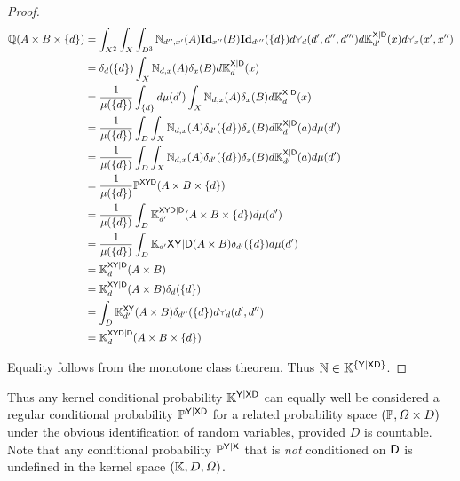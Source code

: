 \begin{proof}
\begin{align}
\prob{Q}(A\times B\times \{d\}) &= \int_{X^2} \int_X \int_{D^3} \kernel{N}_{d'',x'}(A) \textbf{Id}_{x''}(B) \textbf{Id}_{d'''} (\{d\}) d\splitter{0.1}_d(d',d'',d''') d\kernel{K}^{\RV{X}|\RV{D}}_{d'}(x)d\splitter{0.1}_x(x',x'')\\
							&= \delta_d(\{d\}) \int_X \kernel{N}_{d,x}(A) \delta_x(B) d\kernel{K}^{\RV{X}|\RV{D}}_d(x)\\
							&= \frac{1}{\mu(\{d\})} \int_{\{d\}} d\mu(d') \int_X \kernel{N}_{d,x}(A) \delta_x(B) d\kernel{K}^{\RV{X}|\RV{D}}_d(x)\\
							&= \frac{1}{\mu(\{d\})} \int_D\int_X \kernel{N}_{d,x}(A) \delta_{d'}(\{d\}) \delta_x(B) d\kernel{K}^{\RV{X}|\RV{D}}_d(a) d\mu(d')\\
							&= \frac{1}{\mu(\{d\})} \int_D\int_X \kernel{N}_{d,x}(A) \delta_{d'}(\{d\}) \delta_x(B) d\kernel{K}^{\RV{X}|\RV{D}}_{d'}(a) d\mu(d')\\
							&= \frac{1}{\mu(\{d\})} \prob{P}^{\RV{X}\RV{Y}\RV{D}}(A\times B\times \{d\})\\
							&= \frac{1}{\mu(\{d\})} \int_D \kernel{K}_{d'}^{\RV{X}\RV{Y}\RV{D}|\RV{D}}(A\times B\times \{d\})d\mu(d')\\
							&= \frac{1}{\mu(\{d\})} \int_D \kernel{K}_{d'}{\RV{X}\RV{Y}|\RV{D}}(A\times B) \delta_{d'}(\{d\})d\mu(d')\\
							&= \kernel{K}_{d}^{\RV{X}\RV{Y}|\RV{D}}(A\times B)\\
							&= \kernel{K}_d^{\RV{X}\RV{Y}|\RV{D}}(A\times B) \delta_d(\{d\})\\
							&= \int_D \kernel{K}_{d'}^{\RV{X}\RV{Y}} (A\times B) \delta_{d''}(\{d\}) d\splitter{0.1}_d(d',d'')\\
							&= \kernel{K}_d^{\RV{X}\RV{Y}\RV{D}|\RV{D}}(A\times B\times \{d\})
\end{align}


Equality follows from the monotone class theorem. Thus $\mathbb{N}\in \mathbb{K}^{\{\mathsf{Y}|\mathsf{X}\mathsf{D}\}}$.
\end{proof}

Thus any kernel conditional probability $\mathbb{K}^{\mathsf{Y}|\mathsf{X}\mathsf{D}}$ can equally well be considered a regular conditional probability $\mathbb{P}^{\mathsf{Y}|\mathsf{X}\mathsf{D}}$ for a related probability space $(\mathbb{P},\Omega\times D)$ under the obvious identification of random variables, provided $D$ is countable. Note that any conditional probability $\mathbb{P}^{\mathsf{Y}|\mathsf{X}}$ that is \emph{not} conditioned on $\mathsf{D}$ is undefined in the kernel space $(\mathbb{K},D,\Omega)$.

